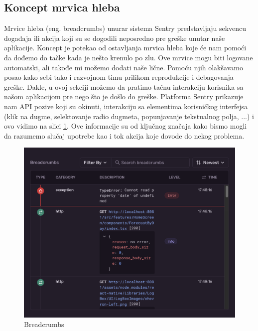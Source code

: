 \documentclass[12pt,oneside]{memoir}
\begin{document}
\subsection{Koncept mrvica hleba}

Mrvice hleba\cite{Breadcrumbs} (eng. breadcrumbs) unurar sistema Sentry predstavljaju sekvencu događaja ili akcija koji su se dogodili neposredno pre greške unutar naše aplikacije. Koncept je potekao od ostavljanja mrvica hleba koje će nam pomoći da dođemo do tačke kada je nešto krenulo po zlu. Ove mrvice mogu biti logovane automatski, ali takođe mi možemo dodati naše lične. Pomoću njih olakšavamo posao kako sebi tako i razvojnom timu prilikom reprodukcije i debagovanja greške. Dakle, u ovoj sekciji možemo da pratimo tačnu interakciju korisnika sa našom aplikacijom pre nego što je došlo do greške. Platforma Sentry prikazuje nam API pozive koji su okinuti, interakciju sa elementima korisničkog interfejsa (klik na dugme, selektovanje radio dugmeta, popunjavanje tekstualnog polja, ...) i ovo vidimo na slici \ref{fig:sentryBreadcrumbs}. Ove informacije su od ključnog značaja kako bismo mogli da razumemo slučaj upotrebe kao i tok akcija koje dovode do nekog problema. \newline

\newline

\begin{figure}[h!]
\centering
\includegraphics[scale=0.4]{docs/images/chapterSeven/SentryBreadcrumbs.png}
\caption{Breadcrumbs}
\label{fig:sentryBreadcrumbs}
\end{figure}
\end{document}
